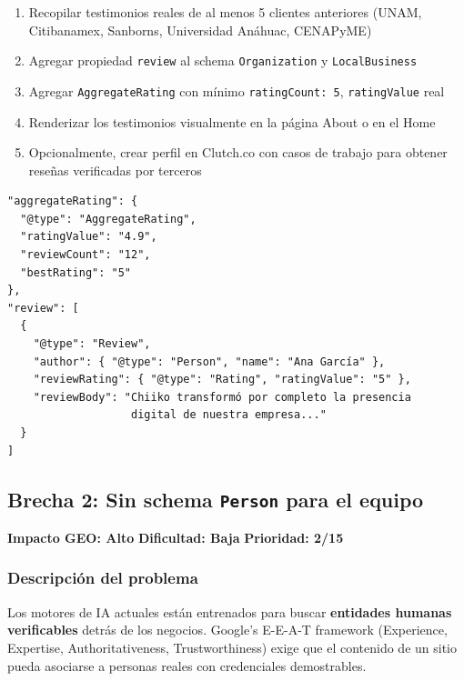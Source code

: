 \documentclass[12pt, a4paper]{article}
\begin{document}
\begin{enumerate}[itemsep=4pt]
  \item Recopilar testimonios reales de al menos 5 clientes anteriores (UNAM, Citibanamex, Sanborns, Universidad Anáhuac, CENAPyME)
  \item Agregar propiedad \texttt{review} al schema \texttt{Organization} y \texttt{LocalBusiness}
  \item Agregar \texttt{AggregateRating} con mínimo \texttt{ratingCount: 5}, \texttt{ratingValue} real
  \item Renderizar los testimonios visualmente en la página About o en el Home
  \item Opcionalmente, crear perfil en Clutch.co con casos de trabajo para obtener reseñas verificadas por terceros
\end{enumerate}

\begin{infobox}[title=Ejemplo de schema requerido]
\begin{verbatim}
"aggregateRating": {
  "@type": "AggregateRating",
  "ratingValue": "4.9",
  "reviewCount": "12",
  "bestRating": "5"
},
"review": [
  {
    "@type": "Review",
    "author": { "@type": "Person", "name": "Ana García" },
    "reviewRating": { "@type": "Rating", "ratingValue": "5" },
    "reviewBody": "Chiiko transformó por completo la presencia
                   digital de nuestra empresa..."
  }
]
\end{verbatim}
\end{infobox}

\subsection{Brecha 2: Sin schema \texttt{Person} para el equipo}

\begin{criticalbox}
\textbf{Impacto GEO: Alto} \quad \textbf{Dificultad: Baja} \quad \textbf{Prioridad: 2/15}
\end{criticalbox}

\subsubsection{Descripción del problema}

Los motores de IA actuales están entrenados para buscar \textbf{entidades humanas verificables} detrás de los negocios. Google's E-E-A-T framework (Experience, Expertise, Authoritativeness, Trustworthiness) exige que el contenido de un sitio pueda asociarse a personas reales con credenciales demostrables.
\end{document}
